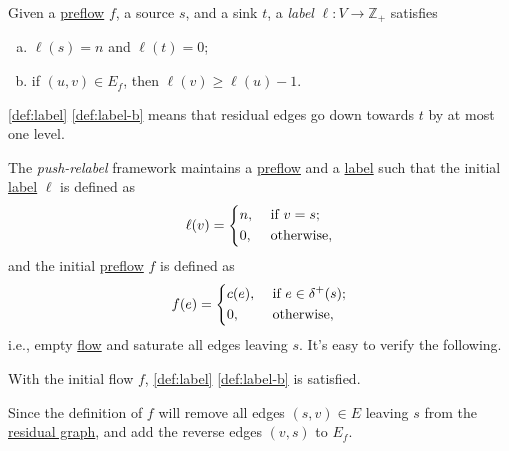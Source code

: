 \begin{definition}[Label]\label{def:label}
	Given a \hyperref[def:preflow]{preflow} \(f\), a source \(s\), and a sink \(t\), a \emph{label} \(\ell \colon V \to \mathbb{Z} _{+}\) satisfies
	\begin{enumerate}[(a)]
		\item\label{def:label-a} \(\ell (s) = n\) and \(\ell (t) = 0\);
		\item\label{def:label-b} if \((u, v) \in E_f\), then \(\ell (v) \geq \ell (u) - 1\).
	\end{enumerate}
\end{definition}

\begin{intuition}
	\autoref{def:label} \autoref{def:label-b} means that residual edges go down towards \(t\) by at most one level.
	\begin{center}
	\end{center}
\end{intuition}

The \emph{push-relabel} framework maintains a \hyperref[def:preflow]{preflow} and a \hyperref[def:label]{label} such that the initial \hyperref[def:label]{label} \(\ell \) is defined as
\begin{equation}\label{eq:initialize-label}
	\ell (v)
	= \begin{dcases}
		n, & \text{ if } v = s ; \\
		0, & \text{ otherwise} ,
	\end{dcases}
\end{equation}
and the initial \hyperref[def:preflow]{preflow} \(f\) is defined as
\begin{equation}\label{eq:initialize-preflow}
	f(e) =
	\begin{dcases}
		c(e), & \text{ if } e \in \delta ^+(s) ; \\
		0,    & \text{ otherwise} ,
	\end{dcases}
\end{equation}
i.e., empty \hyperref[def:flow]{flow} and saturate all edges leaving \(s\). It's easy to verify the following.

\begin{claim}
	With the initial flow \(f\), \autoref{def:label} \autoref{def:label-b} is satisfied.
\end{claim}
\begin{explanation}
	Since the definition of \(f\) will remove all edges \((s, v) \in E\) leaving \(s\) from the \hyperref[def:residual-graph]{residual graph}, and add the reverse edges \((v, s)\) to \(E_f\).
\end{explanation}

